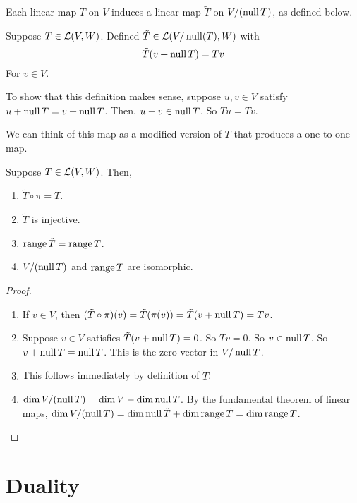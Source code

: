 Each linear map $T$ on $V$ induces a linear map $\tilde T$ on $V/(\operatorname{null} T)$, as defined below.
\begin{definition}
    Suppose $T\in\mathcal{L}(V,W)$. Defined $\tilde T \in \mathcal{L}(V/\operatorname{null}(T), W)$ with
    \[ \tilde T(v+\operatorname{null} T) = Tv\]
    For $v\in V$.
\end{definition}
To show that this definition makes sense, suppose $u,v\in V$ satisfy $u+\operatorname{null} T = v + \operatorname{null} T$. Then, $u-v\in \operatorname{null} T$. So $Tu = Tv$. 

We can think of this map as a modified version of $T$ that produces a one-to-one map.
\begin{theorem}
    Suppose $T\in\mathcal{L}(V,W)$. Then,
    \begin{enumerate}
        \item $\tilde T \circ \pi = T$.
        \item $\tilde T$ is injective.
        \item $\operatorname{range} \tilde T = \operatorname{range} T$.
        \item $V/(\operatorname{null} T)$ and $\operatorname{range} T$ are isomorphic.
    \end{enumerate}
\end{theorem}
\begin{proof}
    \begin{enumerate}
        \item If $v\in V$, then $(\tilde T \circ \pi)(v) = \tilde T(\pi(v)) = \tilde T(v + \operatorname{null} T) = Tv$. 
        \item Suppose $v\in V$ satisfies $\tilde T(v + \operatorname{null} T) = 0$. So $Tv = 0$. So $v\in \operatorname{null} T$. So $v + \operatorname{null} T = \operatorname{null} T$. This is the zero vector in $V/\operatorname{null} T$.
        \item This follows immediately by definition of $\tilde T$.
        \item $\dim V/(\operatorname{null} T) = \dim V - \dim \operatorname{null} T$. By the fundamental theorem of linear maps, $\dim V/(\operatorname{null} T) = \dim\operatorname{null} \tilde T + \dim \operatorname{range} \tilde T = \dim \operatorname{range} T$. 
    \end{enumerate}
\end{proof}
\section{Duality}
